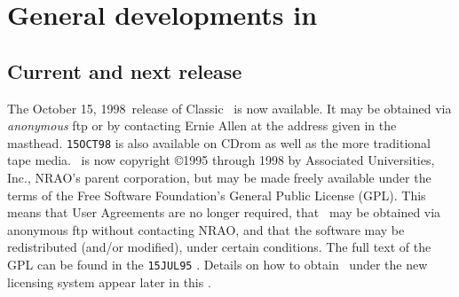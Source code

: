 

\newcommand{\AIPRELEASE}{October 15, 1998}
\newcommand{\AIPVOLUME}{Volume XVIII}
\newcommand{\AIPNUMBER}{Number 2}
\newcommand{\RELEASENAME}{{\tt 15OCT98}}
\newcommand{\OLDNAME}{{\tt 15APR98}}
\newcommand{\NEXTNAME}{{\tt 15APR99}}




\newcommand{\MYSpace}{-11pt}

\normalstyle

\section{General developments in \AIPS}

\subsection{Current and next release}

The \AIPRELEASE\ release of Classic \AIPS\ is now available.  It may
be obtained via \emph{anonymous} ftp or by contacting Ernie Allen at
the address given in the masthead.  {\tt 15OCT98} is also available
on CDrom as well as the more traditional tape media.  \AIPS\ is now
copyright \copyright 1995 through 1998 by Associated Universities,
Inc., NRAO's parent corporation, but may be made freely available
under the terms of the Free Software Foundation's General Public
License \hbox{(GPL)}.  This means that User Agreements are no longer
required, that \AIPS\ may be obtained via anonymous ftp without
contacting NRAO, and that the software may be redistributed (and/or
modified), under certain conditions.  The full text of the GPL can be
found in the \texttt{15JUL95} \Aipsletter. Details on how to obtain
\AIPS\ under the new licensing system appear later in this
\Aipsletter.

